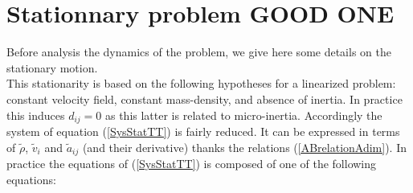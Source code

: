 \documentclass[
10pt, %
a4paper, %
oneside, %
headinclude,footinclude, %
table
]{scrartcl}
\begin{document}
\section{Stationnary problem GOOD ONE}
Before analysis the dynamics of the problem, we give here some details on the stationary motion.\\
This stationarity is based on the following hypotheses for a linearized problem: constant velocity field, constant mass-density, and absence of inertia. In practice this induces $d_{ij}=0$ as this latter is related to micro-inertia. Accordingly the system of equation (\ref{SysStatTT}) is fairly reduced. It can be expressed in terms of $\tilde{\rho}$, $\tilde{v}_{i}$ and $\tilde{a}_{ij}$ (and their derivative) thanks the relations (\ref{ABrelationAdim}). In practice the equations of (\ref{SysStatTT}) is composed of one of the following equations: 
\end{document}
